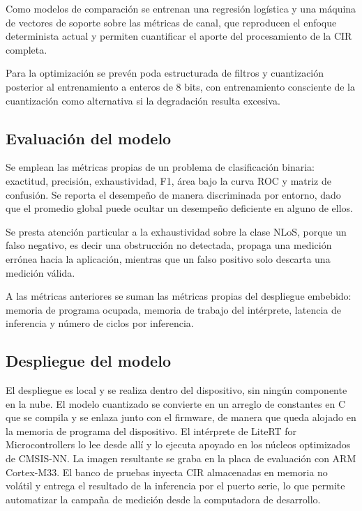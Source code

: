 \documentclass[
11pt, %
]{charter}
\begin{document}
Como modelos de comparación se entrenan una regresión logística y una máquina de vectores de soporte sobre las métricas de canal, que reproducen el enfoque determinista actual y permiten cuantificar el aporte del procesamiento de la CIR completa.

Para la optimización se prevén poda estructurada de filtros y cuantización posterior al entrenamiento a enteros de 8 bits, con entrenamiento consciente de la cuantización como alternativa si la degradación resulta excesiva.

\subsection{Evaluación del modelo}

Se emplean las métricas propias de un problema de clasificación binaria: exactitud, precisión, exhaustividad, F1, área bajo la curva ROC y matriz de confusión. Se reporta el desempeño de manera discriminada por entorno, dado que el promedio global puede ocultar un desempeño deficiente en alguno de ellos.

Se presta atención particular a la exhaustividad sobre la clase NLoS, porque un falso negativo, es decir una obstrucción no detectada, propaga una medición errónea hacia la aplicación, mientras que un falso positivo solo descarta una medición válida.

A las métricas anteriores se suman las métricas propias del despliegue embebido: memoria de programa ocupada, memoria de trabajo del intérprete, latencia de inferencia y número de ciclos por inferencia.

\subsection{Despliegue del modelo}

El despliegue es local y se realiza dentro del dispositivo, sin ningún componente en la nube. El modelo cuantizado se convierte en un arreglo de constantes en C que se compila y se enlaza junto con el firmware, de manera que queda alojado en la memoria de programa del dispositivo. El intérprete de LiteRT for Microcontrollers lo lee desde allí y lo ejecuta apoyado en los núcleos optimizados de CMSIS-NN. La imagen resultante se graba en la placa de evaluación con ARM Cortex-M33. El banco de pruebas inyecta CIR almacenadas en memoria no volátil y entrega el resultado de la inferencia por el puerto serie, lo que permite automatizar la campaña de medición desde la computadora de desarrollo.
\else\fi
\end{document}

